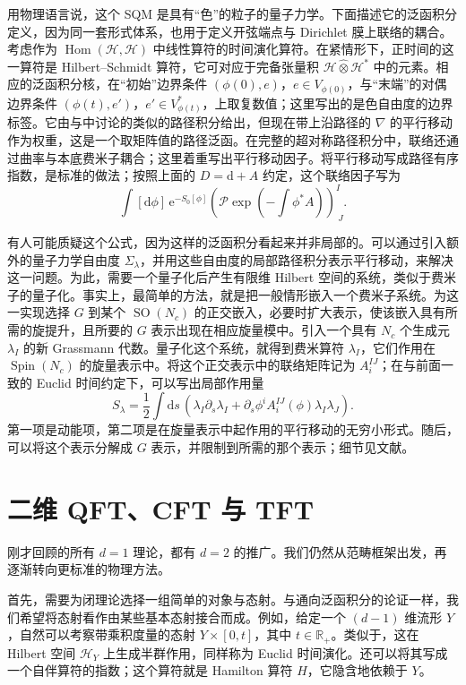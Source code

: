 用物理语言说，这个 SQM 是具有“色”的粒子的量子力学。下面描述它的泛函积分定义，因为同一套形式体系，也用于定义开弦端点与 Dirichlet 膜上联络的耦合。考虑作为 $\operatorname{Hom}(\mathcal{H},\mathcal{H})$ 中线性算符的时间演化算符。在紧情形下，正时间的这一算符是 Hilbert--Schmidt 算符，它可对应于完备张量积 $\mathcal{H}\widehat\otimes\mathcal{H}^*$ 中的元素。相应的泛函积分核，在“初始”边界条件 $(\phi(0),e)$，$e\in V_{\phi(0)}$，与“末端”的对偶边界条件 $(\phi(t),e')$，$e'\in V_{\phi(t)}^*$，上取复数值；这里写出的是色自由度的边界标签。它由与中讨论的类似的路径积分给出，但现在带上沿路径的 $\nabla$ 的平行移动作为权重，这是一个取矩阵值的路径泛函。在完整的超对称路径积分中，联络还通过曲率与本底费米子耦合；这里着重写出平行移动因子。将平行移动写成路径有序指数，是标准的做法；按照上面的 $D=\mathrm{d}+A$ 约定，这个联络因子写为
\[
\int[\mathrm{d}\phi]\,\mathrm{e}^{-S_0[\phi]}
\left(\mathcal{P}\exp\left(-\int\phi^*A\right)\right)^I_{\ J}.
\]

有人可能质疑这个公式，因为这样的泛函积分看起来并非局部的。可以通过引入额外的量子力学自由度 $\Sigma_\lambda$，并用这些自由度的局部路径积分表示平行移动，来解决这一问题。为此，需要一个量子化后产生有限维 Hilbert 空间的系统，类似于费米子的量子化。事实上，最简单的方法，就是把一般情形嵌入一个费米子系统。为这一实现选择 $G$ 到某个 $\operatorname{SO}(N_c)$ 的正交嵌入，必要时扩大表示，使该嵌入具有所需的旋提升，且所要的 $G$ 表示出现在相应旋量模中。引入一个具有 $N_c$ 个生成元 $\lambda_I$ 的新 Grassmann 代数。量子化这个系统，就得到费米算符 $\lambda_I$，它们作用在 $\operatorname{Spin}(N_c)$ 的旋量表示中。将这个正交表示中的联络矩阵记为 $A_i^{IJ}$；在与前面一致的 Euclid 时间约定下，可以写出局部作用量
\[
S_\lambda=\frac12\int\mathrm{d}s\,
\left(\lambda_I\partial_s\lambda_I
+\partial_s\phi^iA_i^{IJ}(\phi)\lambda_I\lambda_J\right).
\]
第一项是动能项，第二项是在旋量表示中起作用的平行移动的无穷小形式。随后，可以将这个表示分解成 $G$ 表示，并限制到所需的那个表示；细节见文献。

\section{二维 QFT、CFT 与 TFT}\label{sec:3.2}

刚才回顾的所有 $d=1$ 理论，都有 $d=2$ 的推广。我们仍然从范畴框架出发，再逐渐转向更标准的物理方法。

首先，需要为闭理论选择一组简单的对象与态射。与通向泛函积分的论证一样，我们希望将态射看作由某些基本态射接合而成。例如，给定一个 $(d-1)$ 维流形 $Y$，自然可以考察带乘积度量的态射 $Y\times[0,t]$，其中 $t\in\mathbb{R}_+$。类似于，这在 Hilbert 空间 $\mathcal{H}_Y$ 上生成半群作用，同样称为 Euclid 时间演化。还可以将其写成一个自伴算符的指数；这个算符就是 Hamilton 算符 $H$，它隐含地依赖于 $Y$。


